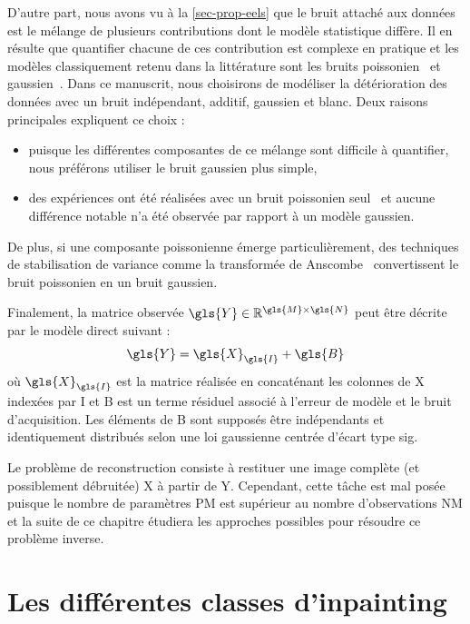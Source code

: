 D'autre part, nous avons vu à la \cref{sec-prop-eels} que le bruit attaché aux données est le mélange de plusieurs contributions dont le modèle statistique diffère. Il en résulte que quantifier chacune de ces contribution est complexe en pratique et les modèles classiquement retenu dans la littérature sont les bruits poissonien~\cite{egerton2011electron, mevenkamp2015poisson, stevens2018apl} et gaussien~\cite{stevens2014potential, binev2012compressed}. Dans ce manuscrit, nous choisirons de modéliser la détérioration des données avec un bruit indépendant, additif, gaussien et blanc. Deux raisons principales expliquent ce choix :
\begin{itemize}
    \item puisque les différentes composantes de ce mélange sont difficile à quantifier, nous préférons utiliser le bruit gaussien plus simple,
    \item des expériences ont été réalisées avec un bruit poissonien seul~\cite{Monier2020SuppNum} et aucune différence notable n'a été observée par rapport à un modèle gaussien.
\end{itemize}
De plus, si une composante poissonienne émerge particulièrement, des techniques de stabilisation de variance comme la transformée de Anscombe~\cite{anscombe1948transformation} convertissent le bruit poissonien en un bruit gaussien.

Finalement, la matrice observée $\gls{Y}\in\mathbb{R}^{\gls{M}\times\gls{N}}$ peut être décrite par le modèle direct suivant :
\begin{equation}
    \gls{Y} = \gls{X}_{\gls{I}} + \gls{B}
\end{equation}
où $\gls{X}_{\gls{I}}$ est la matrice réalisée en concaténant les colonnes de \gls{X} indexées par \gls{I} et \gls{B} est un terme résiduel associé à l'erreur de modèle et le bruit d'acquisition. Les éléments de \gls{B} sont supposés être indépendants et identiquement distribués selon une loi gaussienne centrée d'écart type \gls{sig}.

Le problème de reconstruction consiste à restituer une image complète (et possiblement débruitée) \gls{X} à partir de \gls{Y}. Cependant, cette tâche est mal posée puisque le nombre de paramètres \gls{P}\gls{M} est supérieur au nombre d'observations \gls{N}\gls{M} et la suite de ce chapitre étudiera les approches possibles pour résoudre ce problème inverse.

%
\section{Les différentes classes d'inpainting}

